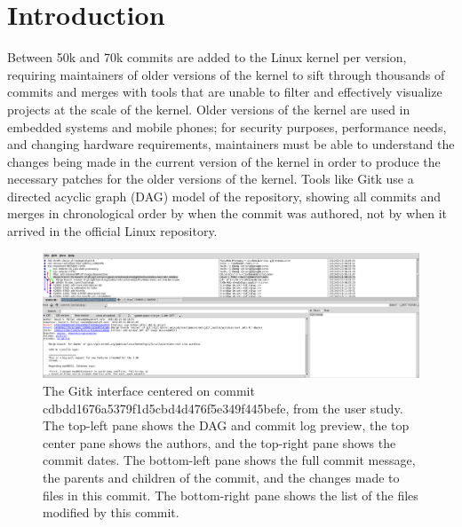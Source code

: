 
\section{Introduction}

Between 50k and 70k commits are added to the Linux kernel per version,
requiring maintainers of older versions of the kernel to sift through
thousands of commits and merges with tools that are unable to filter and
effectively visualize projects at the scale of the kernel. Older
versions of the kernel are used in embedded systems and mobile phones;
for security purposes, performance needs, and changing hardware
requirements, maintainers must be able to understand the changes being
made in the current version of the kernel in order to produce the
necessary patches for the older versions of the kernel. Tools like Gitk
use a directed acyclic graph (DAG) model of the repository, showing all
commits and merges in chronological order by when the commit was
authored, not by when it arrived in the official Linux repository.

\begin{figure}
        \centering
        \includegraphics[width=0.97\linewidth]{figures/gitk.png}
        \caption{The Gitk interface centered on commit
          cdbdd1676a5379f1d5cbd4d476f5e349f445befe, \comB from the user
          study. The top-left pane shows the DAG and commit log preview,
          the top center pane shows the authors, and the top-right
          pane shows the commit dates. The bottom-left pane shows the
          full commit message, the parents and children of the commit,
          and the changes made to files in this commit. The bottom-right
          pane shows the list of the files modified by this commit.}
        \label{fig:gitk}
\end{figure}

